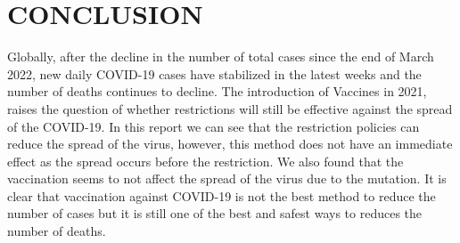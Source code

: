 \documentclass[11pt,a4paper,]{article}
\begin{document}
\hypertarget{conclusion}{%
\section{\texorpdfstring{\textbf{CONCLUSION}}{CONCLUSION}}\label{conclusion}}

Globally, after the decline in the number of total cases since the end of March 2022, new daily COVID-19 cases have stabilized in the latest weeks and the number of deaths continues to decline. The introduction of Vaccines in 2021, raises the question of whether restrictions will still be effective against the spread of the COVID-19. In this report we can see that the restriction policies can reduce the spread of the virus, however, this method does not have an immediate effect as the spread occurs before the restriction. We also found that the vaccination seems to not affect the spread of the virus due to the mutation. It is clear that vaccination against COVID-19 is not the best method to reduce the number of cases but it is still one of the best and safest ways to reduces the number of deaths.

\clearpage

\printbibliography
\end{document}
